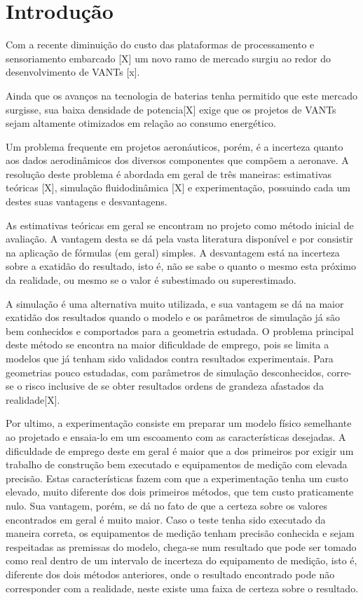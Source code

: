 \chapter{Introdução}\label{chp:intro}

Com a recente diminuição do custo das plataformas de processamento e sensoriamento embarcado [X] um novo ramo de mercado surgiu ao redor do desenvolvimento de VANTs [x].

Ainda que os avanços na tecnologia de baterias tenha permitido que este mercado surgisse, sua baixa densidade de potencia[X] exige que os projetos de VANTs sejam altamente otimizados em relação ao consumo energético.

Um problema frequente em projetos aeronáuticos, porém, é a incerteza quanto aos dados aerodinâmicos dos diversos componentes que compõem a aeronave. A resolução deste problema é abordada em geral de três maneiras: estimativas teóricas [X], simulação fluidodinâmica [X] e experimentação, possuindo cada um destes suas vantagens e desvantagens.

As estimativas teóricas em geral se encontram no projeto como método inicial de avaliação. A vantagem desta se dá pela vasta literatura disponível e por consistir na aplicação de fórmulas (em geral) simples. A desvantagem está na incerteza sobre a exatidão do resultado, isto é, não se sabe o quanto o mesmo esta próximo da realidade, ou mesmo se o valor é subestimado ou superestimado.

A simulação é uma alternativa muito utilizada, e sua vantagem se dá na maior exatidão dos resultados quando o modelo e os parâmetros de simulação já são bem conhecidos e comportados para a geometria estudada. O problema principal deste método se encontra na maior dificuldade de emprego, pois se limita a modelos que já tenham sido validados contra resultados experimentais. Para geometrias pouco estudadas, com parâmetros de simulação desconhecidos, corre-se o risco inclusive de se obter resultados ordens de grandeza afastados da realidade[X].

Por ultimo, a experimentação consiste em preparar um modelo físico semelhante ao projetado e ensaia-lo em um escoamento com as características desejadas. A dificuldade de emprego deste em geral é maior que a dos primeiros por exigir um trabalho de construção bem executado e equipamentos de medição com elevada precisão. Estas características fazem com que a experimentação tenha um custo elevado, muito diferente dos dois primeiros métodos, que tem custo praticamente nulo. Sua vantagem, porém, se dá no fato de que a certeza sobre os valores encontrados em geral é muito maior. Caso o teste tenha sido executado da maneira correta, os equipamentos de medição tenham precisão conhecida e sejam respeitadas as premissas do modelo, chega-se num resultado que pode ser tomado como real dentro de um intervalo de incerteza do equipamento de medição, isto é, diferente dos dois métodos anteriores, onde o resultado encontrado pode não corresponder com a realidade, neste existe uma faixa de certeza sobre o resultado.

